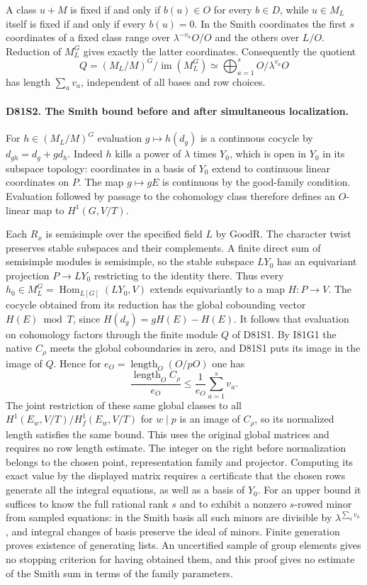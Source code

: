 A class $u+M$ is fixed if and only if $b(u)\in O$ for every $b\in D$,
while $u\in M_L$ itself is fixed if and only if every $b(u)=0$.
In the Smith coordinates the first $s$ coordinates of a fixed
class range over $\lambda^{-v_a}O/O$ and the others over $L/O$.
Reduction of $M_L^G$ gives exactly the latter coordinates.
Consequently the quotient
\[
 Q= (M_L/M)^G/\operatorname{im}(M_L^G)
   \simeq \bigoplus_{a=1}^s O/\lambda^{v_a}O
\]
has length $\sum_a v_a$, independent of all bases and row choices.

\paragraph{D81S2. The Smith bound before and after simultaneous localization.}
For $h\in(M_L/M)^G$ evaluation $g\mapsto h(d_g)$ is a continuous
cocycle by $d_{gh}=d_g+g d_h$. Indeed $h$ kills a power of $\lambda$
times $Y_0$, which is open in $Y_0$ in its subspace topology:
coordinates in a basis of $Y_0$ extend to continuous linear
coordinates on $P$. The map $g\mapsto gE$ is continuous by the
good-family condition. Evaluation followed by passage to the
cohomology class therefore defines an $O$-linear map to $H^1(G,V/T)$.

Each $R_x$ is semisimple over the specified field $L$ by
$\mathrm{GoodR}$. The character twist preserves stable subspaces
and their complements. A finite direct sum of semisimple modules
is semisimple, so the stable subspace $L Y_0$ has an equivariant
projection $P\to L Y_0$ restricting to the identity there.
Thus every $h_0\in M_L^G=\operatorname{Hom}_{L[G]}(L Y_0,V)$
extends equivariantly to a map $H:P\to V$. The cocycle obtained
from its reduction has the global cobounding vector $H(E)\bmod T$,
since $H(d_g)=gH(E)-H(E)$. It follows that evaluation on cohomology
factors through the finite module $Q$ of D81S1. By I81G1 the
native $C_\rho$ meets the global coboundaries in zero, and D81S1
puts its image in the image of $Q$. Hence for
$e_O=\operatorname{length}_O(O/pO)$ one has
\[
 \frac{\operatorname{length}_O C_\rho}{e_O}
       \le \frac{1}{e_O}\sum_{a=1}^s v_a .
\]
The joint restriction of these same global classes to all
$H^1(E_w,V/T)/H_f^1(E_w,V/T)$ for $w\mid p$ is an image of
$C_\rho$, so its normalized length satisfies the same bound.
This uses the original global matrices and requires no row length
estimate. The integer on the right before normalization belongs to
the chosen point, representation family and projector. Computing
its exact value by the displayed matrix requires a certificate that the chosen
rows generate all the integral equations, as well as a basis of
$Y_0$. For an upper bound it suffices to know the full rational
rank $s$ and to exhibit a nonzero $s$-rowed minor from sampled
equations: in the Smith basis all such minors are divisible by
$\lambda^{\sum_a v_a}$, and integral changes of basis preserve
the ideal of minors. Finite generation proves existence of generating
lists. An uncertified sample of group elements gives no stopping
criterion for having obtained them, and this proof gives no estimate
of the Smith sum in terms of the family parameters.
